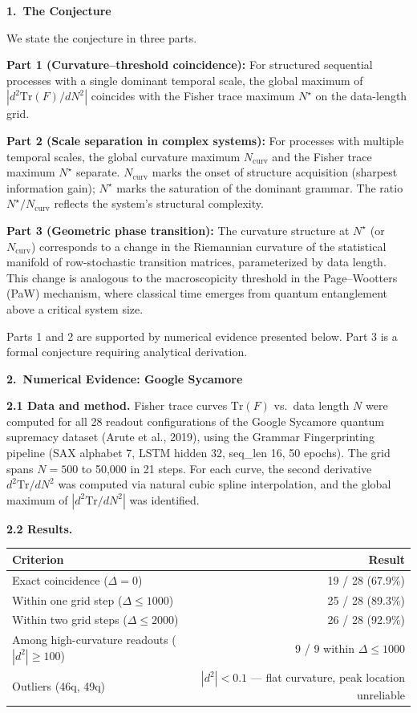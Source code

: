 \documentclass[11pt,a4paper]{article}
\begin{document}
\vspace{0.6em}
\textbf{1.\ The Conjecture}

We state the conjecture in three parts.

\textbf{Part 1 (Curvature--threshold coincidence):} For structured sequential processes with a single dominant temporal scale, the global maximum of $|d^2\mathrm{Tr}(F)/dN^2|$ coincides with the Fisher trace maximum $N^\star$ on the data-length grid.

\textbf{Part 2 (Scale separation in complex systems):} For processes with multiple temporal scales, the global curvature maximum $N_{\mathrm{curv}}$ and the Fisher trace maximum $N^\star$ separate. $N_{\mathrm{curv}}$ marks the onset of structure acquisition (sharpest information gain); $N^\star$ marks the saturation of the dominant grammar. The ratio $N^\star/N_{\mathrm{curv}}$ reflects the system's structural complexity.

\textbf{Part 3 (Geometric phase transition):} The curvature structure at $N^\star$ (or $N_{\mathrm{curv}}$) corresponds to a change in the Riemannian curvature of the statistical manifold of row-stochastic transition matrices, parameterized by data length. This change is analogous to the macroscopicity threshold in the Page--Wootters (PaW) mechanism, where classical time emerges from quantum entanglement above a critical system size.

Parts 1 and 2 are supported by numerical evidence presented below. Part 3 is a formal conjecture requiring analytical derivation.

\vspace{0.5em}
\textbf{2.\ Numerical Evidence: Google Sycamore}

\textbf{2.1 Data and method.} Fisher trace curves $\mathrm{Tr}(F)$ vs.\ data length $N$ were computed for all 28 readout configurations of the Google Sycamore quantum supremacy dataset (Arute et al., 2019), using the Grammar Fingerprinting pipeline (SAX alphabet 7, LSTM hidden 32, seq\_len 16, 50 epochs). The grid spans $N=500$ to 50{,}000 in 21 steps. For each curve, the second derivative $d^2\mathrm{Tr}/dN^2$ was computed via natural cubic spline interpolation, and the global maximum of $|d^2\mathrm{Tr}/dN^2|$ was identified.

\textbf{2.2 Results.}
\begin{center}
\begin{tabular}{@{}lr@{}}
\toprule
Criterion & Result \\
\midrule
Exact coincidence ($\Delta=0$) & 19 / 28 (67.9\%) \\
Within one grid step ($\Delta\le 1000$) & 25 / 28 (89.3\%) \\
Within two grid steps ($\Delta\le 2000$) & 26 / 28 (92.9\%) \\
Among high-curvature readouts ($|d^2|\ge 100$) & 9 / 9 within $\Delta\le 1000$ \\
Outliers (46q, 49q) & $|d^2|<0.1$ --- flat curvature, peak location unreliable \\
\bottomrule
\end{tabular}
\end{center}
\end{document}
